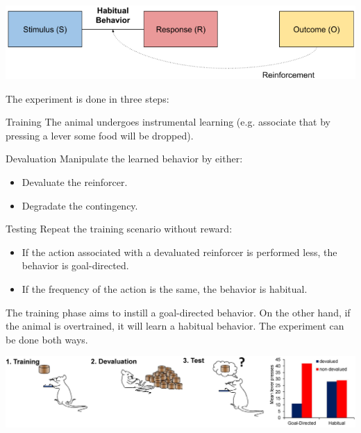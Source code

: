 \begin{descriptionlist}
        \begin{center}
            \includegraphics[width=0.65\linewidth]{./img/habitual_behavior.png}
        \end{center}

\end{descriptionlist} 

\begin{casestudy}
    The experiment is done in three steps:
    \begin{descriptionlist}
        \item[Training] 
            The animal undergoes instrumental learning (e.g. associate that by pressing a lever some food will be dropped).
        
        \item[Devaluation] 
            Manipulate the learned behavior by either:
            \begin{itemize}
                \item Devaluate the reinforcer.
                \item Degradate the contingency.
            \end{itemize}

        \item[Testing] 
            Repeat the training scenario without reward:
            \begin{itemize}
                \item If the action associated with a devaluated reinforcer is performed less, the behavior is goal-directed.
                \item If the frequency of the action is the same, the behavior is habitual.
            \end{itemize}
    \end{descriptionlist}

    \indenttbox
    \begin{remark}
        The training phase aims to instill a goal-directed behavior.
        On the other hand, if the animal is overtrained, it will learn a habitual behavior.
        The experiment can be done both ways.
    \end{remark}

    \begin{center}
        \includegraphics[width=0.85\linewidth]{./img/goal_directed_vs_habitual.png}
    \end{center}
\end{casestudy}

